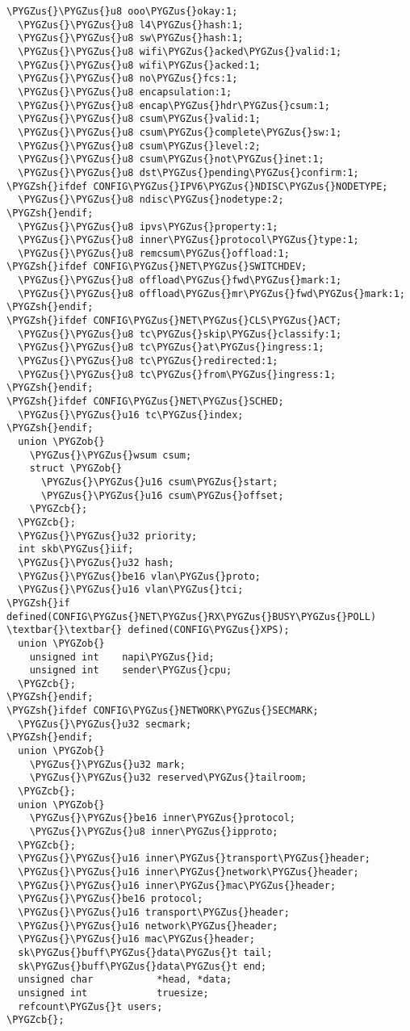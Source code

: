 \documentclass[a4paper,8pt,english]{sphinxmanual}
\def\PYGZus{\char`\_}
\def\PYGZob{\char`\{}
\def\PYGZcb{\char`\}}
\def\PYGZsh{\char`\#}
\begin{document}
\begin{Verbatim}[commandchars=\\\{\}]
  \PYGZus{}\PYGZus{}u8 ooo\PYGZus{}okay:1;
  \PYGZus{}\PYGZus{}u8 l4\PYGZus{}hash:1;
  \PYGZus{}\PYGZus{}u8 sw\PYGZus{}hash:1;
  \PYGZus{}\PYGZus{}u8 wifi\PYGZus{}acked\PYGZus{}valid:1;
  \PYGZus{}\PYGZus{}u8 wifi\PYGZus{}acked:1;
  \PYGZus{}\PYGZus{}u8 no\PYGZus{}fcs:1;
  \PYGZus{}\PYGZus{}u8 encapsulation:1;
  \PYGZus{}\PYGZus{}u8 encap\PYGZus{}hdr\PYGZus{}csum:1;
  \PYGZus{}\PYGZus{}u8 csum\PYGZus{}valid:1;
  \PYGZus{}\PYGZus{}u8 csum\PYGZus{}complete\PYGZus{}sw:1;
  \PYGZus{}\PYGZus{}u8 csum\PYGZus{}level:2;
  \PYGZus{}\PYGZus{}u8 csum\PYGZus{}not\PYGZus{}inet:1;
  \PYGZus{}\PYGZus{}u8 dst\PYGZus{}pending\PYGZus{}confirm:1;
\PYGZsh{}ifdef CONFIG\PYGZus{}IPV6\PYGZus{}NDISC\PYGZus{}NODETYPE;
  \PYGZus{}\PYGZus{}u8 ndisc\PYGZus{}nodetype:2;
\PYGZsh{}endif;
  \PYGZus{}\PYGZus{}u8 ipvs\PYGZus{}property:1;
  \PYGZus{}\PYGZus{}u8 inner\PYGZus{}protocol\PYGZus{}type:1;
  \PYGZus{}\PYGZus{}u8 remcsum\PYGZus{}offload:1;
\PYGZsh{}ifdef CONFIG\PYGZus{}NET\PYGZus{}SWITCHDEV;
  \PYGZus{}\PYGZus{}u8 offload\PYGZus{}fwd\PYGZus{}mark:1;
  \PYGZus{}\PYGZus{}u8 offload\PYGZus{}mr\PYGZus{}fwd\PYGZus{}mark:1;
\PYGZsh{}endif;
\PYGZsh{}ifdef CONFIG\PYGZus{}NET\PYGZus{}CLS\PYGZus{}ACT;
  \PYGZus{}\PYGZus{}u8 tc\PYGZus{}skip\PYGZus{}classify:1;
  \PYGZus{}\PYGZus{}u8 tc\PYGZus{}at\PYGZus{}ingress:1;
  \PYGZus{}\PYGZus{}u8 tc\PYGZus{}redirected:1;
  \PYGZus{}\PYGZus{}u8 tc\PYGZus{}from\PYGZus{}ingress:1;
\PYGZsh{}endif;
\PYGZsh{}ifdef CONFIG\PYGZus{}NET\PYGZus{}SCHED;
  \PYGZus{}\PYGZus{}u16 tc\PYGZus{}index;
\PYGZsh{}endif;
  union \PYGZob{}
    \PYGZus{}\PYGZus{}wsum csum;
    struct \PYGZob{}
      \PYGZus{}\PYGZus{}u16 csum\PYGZus{}start;
      \PYGZus{}\PYGZus{}u16 csum\PYGZus{}offset;
    \PYGZcb{};
  \PYGZcb{};
  \PYGZus{}\PYGZus{}u32 priority;
  int skb\PYGZus{}iif;
  \PYGZus{}\PYGZus{}u32 hash;
  \PYGZus{}\PYGZus{}be16 vlan\PYGZus{}proto;
  \PYGZus{}\PYGZus{}u16 vlan\PYGZus{}tci;
\PYGZsh{}if defined(CONFIG\PYGZus{}NET\PYGZus{}RX\PYGZus{}BUSY\PYGZus{}POLL) \textbar{}\textbar{} defined(CONFIG\PYGZus{}XPS);
  union \PYGZob{}
    unsigned int    napi\PYGZus{}id;
    unsigned int    sender\PYGZus{}cpu;
  \PYGZcb{};
\PYGZsh{}endif;
\PYGZsh{}ifdef CONFIG\PYGZus{}NETWORK\PYGZus{}SECMARK;
  \PYGZus{}\PYGZus{}u32 secmark;
\PYGZsh{}endif;
  union \PYGZob{}
    \PYGZus{}\PYGZus{}u32 mark;
    \PYGZus{}\PYGZus{}u32 reserved\PYGZus{}tailroom;
  \PYGZcb{};
  union \PYGZob{}
    \PYGZus{}\PYGZus{}be16 inner\PYGZus{}protocol;
    \PYGZus{}\PYGZus{}u8 inner\PYGZus{}ipproto;
  \PYGZcb{};
  \PYGZus{}\PYGZus{}u16 inner\PYGZus{}transport\PYGZus{}header;
  \PYGZus{}\PYGZus{}u16 inner\PYGZus{}network\PYGZus{}header;
  \PYGZus{}\PYGZus{}u16 inner\PYGZus{}mac\PYGZus{}header;
  \PYGZus{}\PYGZus{}be16 protocol;
  \PYGZus{}\PYGZus{}u16 transport\PYGZus{}header;
  \PYGZus{}\PYGZus{}u16 network\PYGZus{}header;
  \PYGZus{}\PYGZus{}u16 mac\PYGZus{}header;
  sk\PYGZus{}buff\PYGZus{}data\PYGZus{}t tail;
  sk\PYGZus{}buff\PYGZus{}data\PYGZus{}t end;
  unsigned char           *head, *data;
  unsigned int            truesize;
  refcount\PYGZus{}t users;
\PYGZcb{};
\end{Verbatim}
\end{document}
